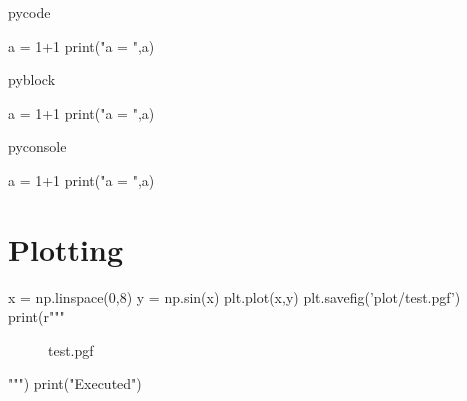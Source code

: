 \documentclass[a4paper]{article}
\begin{document}
pycode
\begin{pycode}
a = 1+1
print("a = ",a)
\end{pycode}

pyblock
\begin{pyblock}
a = 1+1
print("a = ",a)
\end{pyblock}

pyconsole
\begin{pyconsole}
a = 1+1
print("a = ",a)
\end{pyconsole}

\section{Plotting}%
\label{sec:plotting}



\begin{pycode}
x = np.linspace(0,8)
y = np.sin(x)
plt.plot(x,y)
plt.savefig('plot/test.pgf')
print(r"""
\begin{figure}[ht]
	\centering
	{test.pgf}
\end{figure} """)
print("Executed")
\end{pycode}
\end{document}
